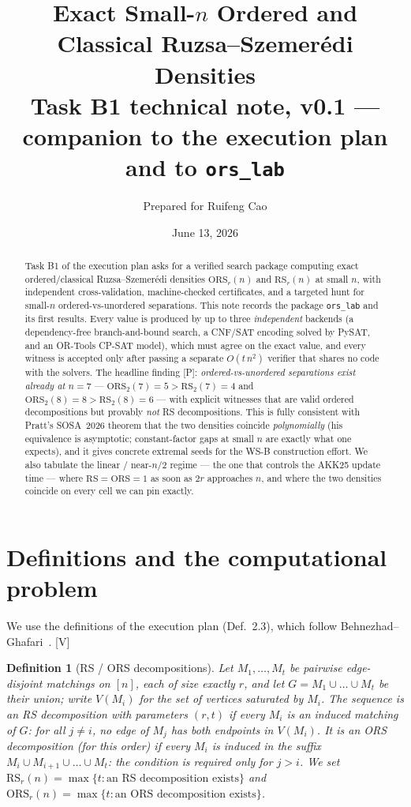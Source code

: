 \documentclass[11pt]{article}
\title{Exact Small-$n$ Ordered and Classical Ruzsa--Szemer\'edi Densities\\[2pt]
{\large Task B1 technical note, v0.1 --- companion to the execution plan and to \texttt{ors\_lab}}}
\author{Prepared for Ruifeng Cao}
\date{June 13, 2026}
\newcommand{\statusV}{\textsf{\footnotesize[V]}}
\newcommand{\statusP}{\textsf{\footnotesize[P]}}
\newcommand{\RS}{\mathrm{RS}}
\newcommand{\ORS}{\mathrm{ORS}}
\newtheorem{definition}{Definition}
\begin{document}
\maketitle

\begin{abstract}
\noindent Task B1 of the execution plan asks for a verified search package
computing exact ordered/classical Ruzsa--Szemer\'edi densities $\ORS_r(n)$
and $\RS_r(n)$ at small $n$, with independent cross-validation, machine-checked
certificates, and a targeted hunt for small-$n$ ordered-vs-unordered
separations. This note records the package \texttt{ors\_lab} and its first
results. Every value is produced by up to three \emph{independent} backends
(a dependency-free branch-and-bound search, a CNF/SAT encoding solved by
PySAT, and an OR-Tools CP-SAT model), which must agree on the exact value,
and every witness is accepted only after passing a separate $O(t\,n^2)$
verifier that shares no code with the solvers. The headline finding
\statusP{}: \emph{ordered-vs-unordered separations exist already at $n=7$} ---
$\ORS_2(7)=5>\RS_2(7)=4$ and $\ORS_2(8)=8>\RS_2(8)=6$ --- with explicit
witnesses that are valid ordered decompositions but provably \emph{not} RS
decompositions. This is fully consistent with Pratt's SOSA~2026 theorem that
the two densities coincide \emph{polynomially} (his equivalence is asymptotic;
constant-factor gaps at small $n$ are exactly what one expects), and it gives
concrete extremal seeds for the WS-B construction effort. We also tabulate the
linear / near-$n/2$ regime --- the one that controls the AKK25 update time ---
where $\RS=\ORS=1$ as soon as $2r$ approaches $n$, and where the two densities
coincide on every cell we can pin exactly.
\end{abstract}

\section{Definitions and the computational problem}\label{sec:def}

We use the definitions of the execution plan (Def.~2.3), which follow
Behnezhad--Ghafari~\cite{BG24}. \statusV

\begin{definition}[RS / ORS decompositions]\label{def:ors}
Let $M_1,\dots,M_t$ be pairwise edge-disjoint matchings on $[n]$, each of
size exactly $r$, and let $G=M_1\cup\dots\cup M_t$ be their union; write
$V(M_i)$ for the set of vertices saturated by $M_i$. The sequence is an
\emph{RS decomposition} with parameters $(r,t)$ if every $M_i$ is an
\emph{induced} matching of $G$: for all $j\ne i$, no edge of $M_j$ has both
endpoints in $V(M_i)$. It is an \emph{ORS decomposition} (for this order) if
every $M_i$ is induced in the suffix $M_i\cup M_{i+1}\cup\dots\cup M_t$: the
condition is required only for $j>i$. We set
$\RS_r(n)=\max\{t:\text{an RS decomposition exists}\}$ and
$\ORS_r(n)=\max\{t:\text{an ORS decomposition exists}\}$.
\end{definition}
\end{document}
